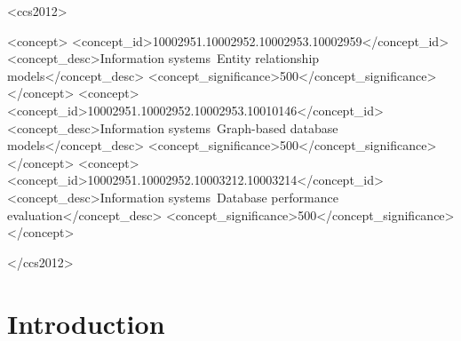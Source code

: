 \documentclass[sigconf]{acmart}
\begin{document}
\begin{CCSXML}
<ccs2012>

    <concept>
        <concept_id>10002951.10002952.10002953.10002959</concept_id>
        <concept_desc>Information systems~Entity relationship models</concept_desc>
        <concept_significance>500</concept_significance>
    </concept>
    <concept>
        <concept_id>10002951.10002952.10002953.10010146</concept_id>
        <concept_desc>Information systems~Graph-based database models</concept_desc>
        <concept_significance>500</concept_significance>
    </concept>
    <concept>
        <concept_id>10002951.10002952.10003212.10003214</concept_id>
        <concept_desc>Information systems~Database performance evaluation</concept_desc>
        <concept_significance>500</concept_significance>
    </concept>

</ccs2012>
\end{CCSXML}





\maketitle












\section{Introduction}
\end{document}
